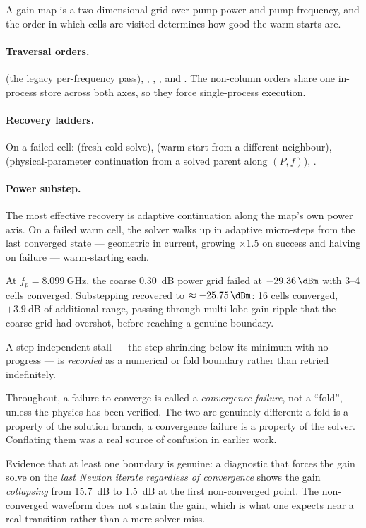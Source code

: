 A gain map is a two-dimensional grid over pump power and pump frequency, and the
order in which cells are visited determines how good the warm starts are.

\paragraph{Traversal orders.}  (the legacy per-frequency pass),
, , , and . The
non-column orders share one in-process store across both axes, so they force
single-process execution.

\paragraph{Recovery ladders.} On a failed cell:  (fresh cold
solve),  (warm start from a different neighbour),
 (physical-parameter continuation from a solved parent along
$(P,f)$), .

\paragraph{Power substep.} The most effective recovery is adaptive continuation
along the map's own power axis. On a failed warm cell, the solver walks up in
adaptive \si{\dBm} micro-steps from the last converged state --- geometric in
current, growing $\times1.5$ on success and halving on failure --- warm-starting
each.

\begin{measured}
At $f_p = \SI{8.099}{\giga\hertz}$, the coarse \SI{0.30}{\dB} power grid failed
at $\SI{-29.36}{\dBm}$ with 3--4 cells converged. Substepping recovered to
$\approx\SI{-25.75}{\dBm}$: 16 cells converged, $+\SI{3.9}{\dB}$ of additional
range, passing through multi-lobe gain ripple that the coarse grid had
overshot, before reaching a genuine boundary.
\end{measured}

A step-independent stall --- the step shrinking below its minimum with no
progress --- is \emph{recorded} as a numerical or fold boundary rather than
retried indefinitely.

\begin{caveat}[terminology]
Throughout, a failure to converge is called a \emph{convergence failure}, not a
``fold'', unless the physics has been verified. The two are genuinely different:
a fold is a property of the solution branch, a convergence failure is a property
of the solver. Conflating them was a real source of confusion in earlier work.

Evidence that at least one boundary is genuine: a diagnostic that forces the
gain solve on the \emph{last Newton iterate regardless of convergence} shows the
gain \emph{collapsing} from \SI{15.7}{\dB} to \SI{1.5}{\dB} at the first
non-converged point. The non-converged waveform does not sustain the gain, which
is what one expects near a real transition rather than a mere solver miss.
\end{caveat}

